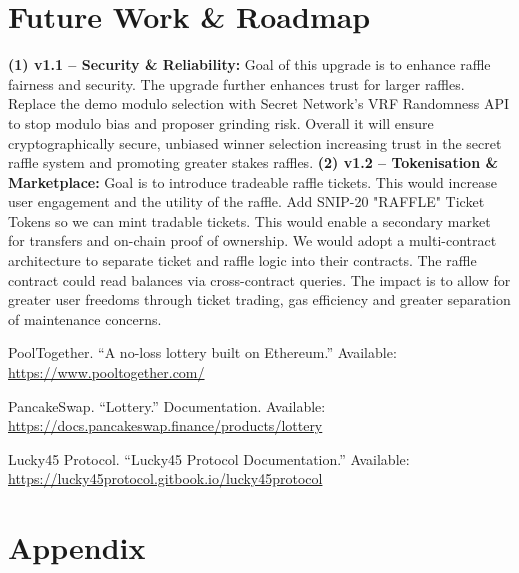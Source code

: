 \documentclass[8pt]{extarticle}
\begin{document}
\section{Future Work \& Roadmap}

\textbf{(1) v1.1 – Security \& Reliability:} Goal of this upgrade is to enhance raffle fairness and security. The upgrade further enhances trust for larger raffles. Replace the demo modulo selection with Secret Network's VRF Randomness API to stop modulo bias and proposer grinding risk. Overall it will ensure cryptographically secure, unbiased winner selection increasing trust in the secret raffle system and promoting greater stakes raffles. \textbf{(2) v1.2 – Tokenisation \& Marketplace:} Goal is to introduce tradeable raffle tickets. This would increase user engagement and the utility of the raffle. Add SNIP-20 "RAFFLE" Ticket Tokens so we can mint tradable tickets. This would enable a secondary market for transfers and on-chain proof of ownership. We would adopt a multi-contract architecture to separate ticket and raffle logic into their contracts. The raffle contract could read balances via cross-contract queries. The impact is to allow for greater user freedoms through ticket trading, gas efficiency and greater separation of maintenance concerns.

{\small
\begin{thebibliography}{9}

PoolTogether. ``A no-loss lottery built on Ethereum.'' Available: \url{https://www.pooltogether.com/}

PancakeSwap. ``Lottery.'' Documentation. Available: \url{https://docs.pancakeswap.finance/products/lottery}

Lucky45 Protocol. ``Lucky45 Protocol Documentation.'' Available: \url{https://lucky45protocol.gitbook.io/lucky45protocol}
\end{thebibliography}}

\section{Appendix}
\end{document}
